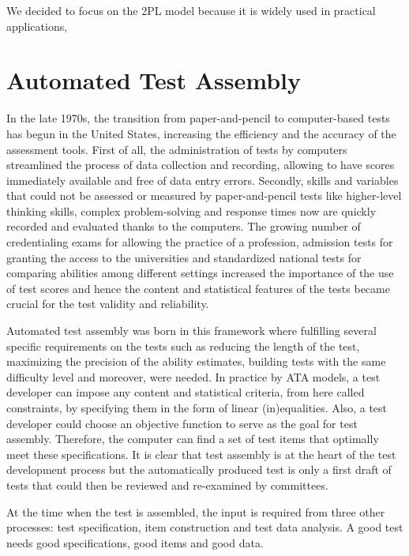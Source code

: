 We decided to focus on the 2PL model because it is widely used in practical applications, \textcite{desimone2015item}

\section{Automated Test Assembly}\label{sec:ata}

In the late 1970s, the transition from paper-and-pencil to computer-based tests has begun in the United States, increasing the efficiency and the accuracy of the assessment tools.
First of all, the administration of tests by computers streamlined the process of data collection and recording, allowing to have scores immediately available and free of data entry errors.
Secondly, skills and variables that could not be assessed or measured by paper-and-pencil tests like higher-level thinking skills, complex problem-solving and response times now are quickly recorded and evaluated thanks to the computers.
The growing number of credentialing exams for allowing the practice of a profession, admission tests for granting the access to the universities and standardized national tests for comparing abilities among different settings increased the importance of the use of test scores and hence the content and statistical features of the tests became crucial for the test validity and reliability.

Automated test assembly was born in this framework where fulfilling several specific requirements on the tests such as reducing the length of the test, maximizing the precision of the ability estimates, building tests with the same difficulty level and moreover, were needed.
In practice by ATA models, a test developer can impose any content and statistical criteria, from here called constraints, by specifying them in the form of linear (in)equalities.
Also, a test developer could choose an objective function to serve as the goal for test assembly.
Therefore, the computer can find a set of test items that optimally meet these specifications.
It is clear that test assembly is at the heart of the test development process but the automatically produced test is only a first draft of tests that could then be reviewed and re-examined by committees.

At the time when the test is assembled, the input is required from  three other processes: test specification, item construction and test data
analysis.
A good test needs good specifications, good items and good data.


